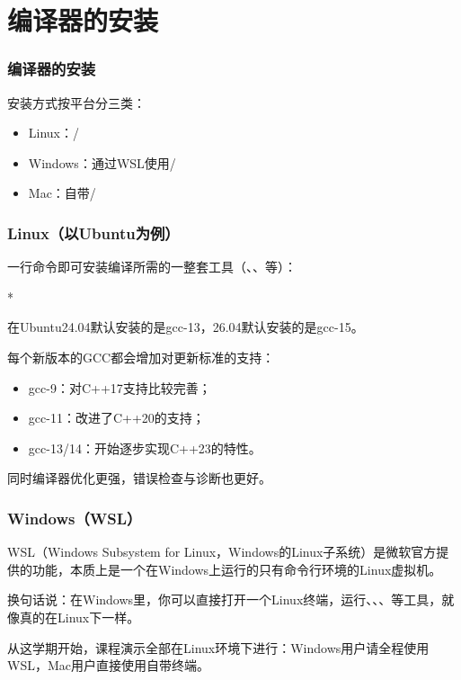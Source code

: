 \section{编译器的安装}

\begin{frame}
    \frametitle{编译器的安装}
    安装方式按平台分三类：
    \begin{itemize}
        \item \alert{Linux}：/
        \item \alert{Windows}：通过WSL使用/
        \item \alert{Mac}：自带/
    \end{itemize}
\end{frame}

\begin{frame}
    \frametitle{Linux（以Ubuntu为例）}
    一行命令即可安装编译所需的一整套工具（、、等）：
    \begin{Code}*
        
    \end{Code}

    在Ubuntu24.04默认安装的是gcc-13，26.04默认安装的是gcc-15。

    每个新版本的GCC都会增加对更新标准的支持：
    \begin{itemize}
        \item gcc-9：对C++17支持比较完善；
        \item gcc-11：改进了C++20的支持；
        \item gcc-13/14：开始逐步实现C++23的特性。
    \end{itemize}
    同时编译器优化更强，错误检查与诊断也更好。
\end{frame}

\begin{frame}
    \frametitle{Windows（WSL）}
    WSL（Windows Subsystem for Linux，Windows的Linux子系统）是微软官方提供的功能，本质上是一个在Windows上运行的\alert{只有命令行环境的Linux虚拟机}。

    换句话说：在Windows里，你可以直接打开一个Linux终端，运行、、、等工具，就像真的在Linux下一样。

    \alert{从这学期开始，课程演示全部在Linux环境下进行}：Windows用户请全程使用WSL，Mac用户直接使用自带终端。
\end{frame}

